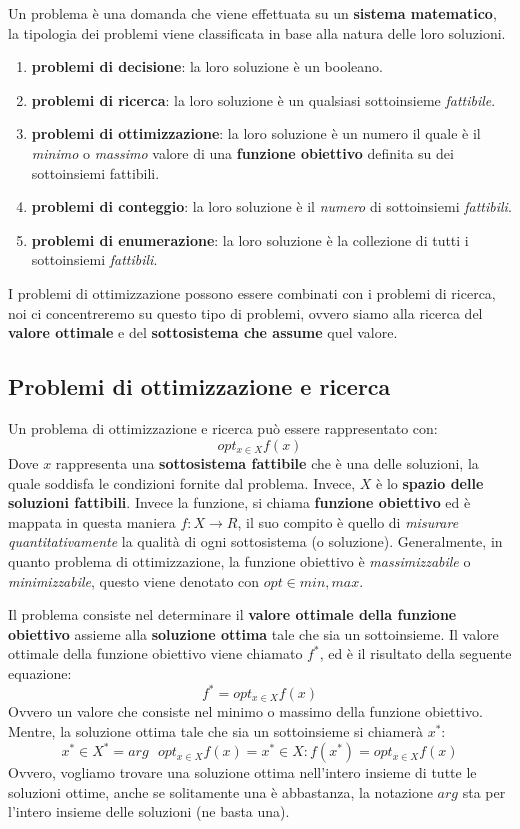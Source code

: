 \documentclass{article}
\begin{document}
Un problema è una domanda che viene effettuata su un \textbf{sistema matematico}, la tipologia dei problemi viene classificata in base alla natura delle loro soluzioni.
\begin{enumerate}
    \item \textbf{problemi di decisione}: la loro soluzione è un booleano.
    \item \textbf{problemi di ricerca}: la loro soluzione è un qualsiasi sottoinsieme \textit{fattibile}.
    \item \textbf{problemi di ottimizzazione}: la loro soluzione è un numero il quale è il \textit{minimo} o \textit{massimo} valore di una \textbf{funzione obiettivo}
          definita su dei sottoinsiemi fattibili.
    \item \textbf{problemi di conteggio}: la loro soluzione è il \textit{numero} di sottoinsiemi \textit{fattibili}.
    \item \textbf{problemi di enumerazione}: la loro soluzione è la collezione di tutti i sottoinsiemi \textit{fattibili}.
\end{enumerate}
I problemi di ottimizzazione possono essere combinati con i problemi di ricerca, noi ci concentreremo su questo tipo di problemi, ovvero siamo alla ricerca del
\textbf{valore ottimale} e del \textbf{sottosistema che assume} quel valore.

\subsection{Problemi di ottimizzazione e ricerca}

Un problema di ottimizzazione e ricerca può essere rappresentato con:
$$opt_{x\in X}f(x)$$
Dove $x$ rappresenta una \textbf{sottosistema fattibile} che è una delle soluzioni, la quale soddisfa le condizioni fornite dal problema. Invece, $X$
è lo \textbf{spazio delle soluzioni fattibili}. Invece la funzione, si chiama \textbf{funzione obiettivo} ed è mappata in questa maniera $f:X \rightarrow R$,
il suo compito è quello di \textit{misurare quantitativamente} la qualità di ogni sottosistema (o soluzione).
Generalmente, in quanto problema di ottimizzazione, la funzione obiettivo è \textit{massimizzabile} o \textit{minimizzabile}, questo viene denotato con $opt\in {min,max}$.

Il problema consiste nel determinare il \textbf{valore ottimale della funzione obiettivo} assieme alla \textbf{soluzione ottima} tale che sia un sottoinsieme.
Il valore ottimale della funzione obiettivo viene chiamato $f^*$, ed è il risultato della seguente equazione:
$$f^*=opt_{x\in X}f(x)$$
Ovvero un valore che consiste nel minimo o massimo della funzione obiettivo. Mentre, la soluzione ottima tale che sia un sottoinsieme si chiamerà $x^*$:
$$x^*\in X^*=arg\textit{ } opt_{x\in X}f(x)={x^* \in X : f(x^*)=opt_{x\in X}f(x)}$$
Ovvero, vogliamo trovare una soluzione ottima nell'intero insieme di tutte le soluzioni ottime, anche se solitamente una è abbastanza, la notazione $arg$
sta per l'intero insieme delle soluzioni (ne basta una).
\end{document}
